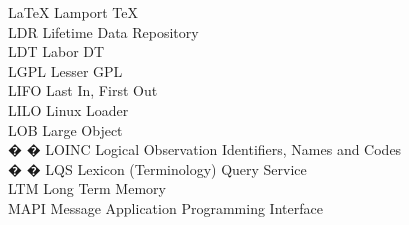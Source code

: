 \begin{tabbing}


    \>LaTeX \>\>Lamport TeX\\


    \>LDR \>\>Lifetime Data Repository\\

    \>LDT \>\>Labor DT\\

    \>LGPL \>\>Lesser GPL\\

    \>LIFO \>\>Last In, First Out\\

    \>LILO \>\>Linux Loader\\


    \>LOB \>\>Large Object\\

� � \>LOINC \>\>Logical Observation Identifiers, Names and Codes\\

� � \>LQS \>\>Lexicon (Terminology) Query Service\\




    \>LTM \>\>Long Term Memory\\





    \>MAPI \>\>Message Application Programming Interface\\


\end{tabbing}
